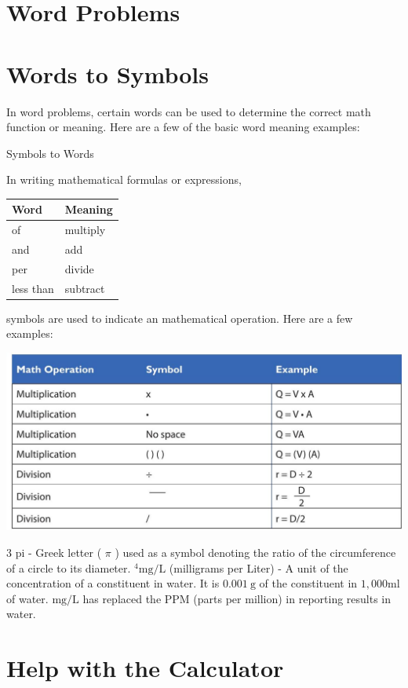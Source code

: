 \documentclass[10pt]{article}
\begin{document}
\section{Word Problems}
\section{Words to Symbols}
In word problems, certain words can be used to determine the correct math function or meaning. Here are a few of the basic word meaning examples:

Symbols to Words

In writing mathematical formulas or expressions,

\begin{tabular}{|ll|}
\hline
Word & Meaning \\
\hline
of & multiply \\
and & add \\
per & divide \\
less than & subtract \\
\hline
\end{tabular}

symbols are used to indicate an mathematical operation. Here are a few examples:

\includegraphics[max width=\textwidth]{2022_09_11_72dbedc910e6e984560cg-04}

3 pi - Greek letter ( $\pi$ ) used as a symbol denoting the ratio of the circumference of a circle to its diameter. ${ }^{4} \mathrm{mg} / \mathrm{L}$ (milligrams per Liter) - A unit of the concentration of a constituent in water. It is $0.001 \mathrm{~g}$ of the constituent in $1,000 \mathrm{ml}$ of water. $\mathrm{mg} / \mathrm{L}$ has replaced the PPM (parts per million) in reporting results in water.

\section{Help with the Calculator}
\end{document}
